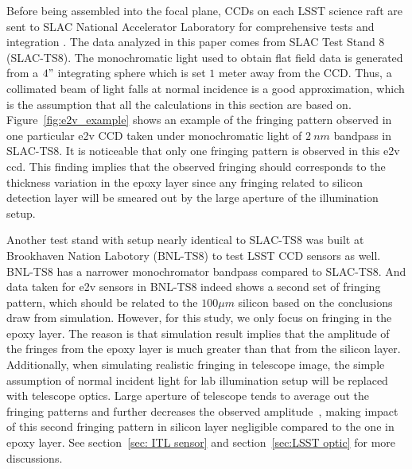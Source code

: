 \documentclass[twocolumn]{aastex63} %
\begin{document}
\begin{CJK*}{UTF8}{gbsn}
Before being assembled into the focal plane, CCDs on each LSST science raft are sent to SLAC National Accelerator Laboratory for comprehensive tests and integration \citep{Bond18,Ivezi19}. The data analyzed in this paper comes from SLAC Test Stand 8 (SLAC-TS8). The monochromatic light used to obtain flat field data is generated from a $4"$ integrating sphere which is set $1$ meter away from the CCD. Thus, a collimated beam of light falls at normal incidence is a good approximation, which is the assumption that all the calculations in this section are based on. Figure~\ref{fig:e2v_example} shows an example of the fringing pattern observed in one particular e2v CCD taken under monochromatic light of $2\ nm$ bandpass in SLAC-TS8. It is noticeable that only one fringing pattern is observed in this e2v ccd. This finding implies that the observed fringing should corresponds to the thickness variation in the epoxy layer since any fringing related to silicon detection layer will be smeared out by the large aperture of the illumination setup.

Another test stand with setup nearly identical to SLAC-TS8 was built at Brookhaven Nation Labotory (BNL-TS8) to test LSST CCD sensors as well. BNL-TS8 has a narrower monochromator bandpass compared to SLAC-TS8. And data taken for e2v sensors in BNL-TS8 indeed shows a second set of fringing pattern, which should be related to the $100\mu m$ silicon based on the conclusions draw from simulation. However, for this study, we only focus on fringing in the epoxy layer. The reason is that simulation result implies that the amplitude of the fringes from the epoxy layer is much greater than that from the silicon layer.  Additionally, when simulating realistic fringing in telescope image, the simple assumption of normal incident light for lab illumination setup will be replaced with telescope optics. Large aperture of telescope tends to average out the fringing patterns and further decreases the observed amplitude~\citep{Groom17}, making impact of this second fringing pattern in silicon layer negligible compared to the one in epoxy layer. See section~\ref{sec: ITL sensor} and section~\ref{sec:LSST optic} for more discussions. 



\end{CJK*}
\end{document}
